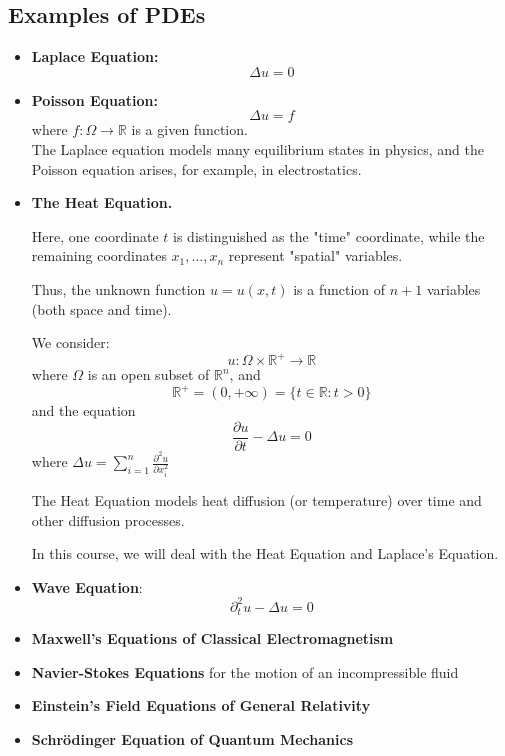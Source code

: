 
\subsection{Examples of PDEs}
\begin{itemize}
    \item \textbf{Laplace Equation:} 
\[
\Delta u = 0
\]
    \item \textbf{Poisson Equation:} 
\[
\Delta u = f
\]
where \( f: \Omega \to \mathbb{R} \) is a given function.\\
The Laplace equation models many equilibrium states in physics, and the Poisson equation arises, for example, in electrostatics.

\item \textbf{The Heat Equation.}

Here, one coordinate \( t \) is distinguished as the "time" coordinate, while the remaining coordinates \( x_1, \dots, x_n \) represent "spatial" variables. 

Thus, the unknown function \( u = u(x, t) \) is a function of $n+1$ variables (both space and time).

We consider:
\begin{equation*}
    u: \Omega \times \mathbb{R}^+ \rightarrow \mathbb{R}
\end{equation*}
where \( \Omega \) is an open subset of \( \mathbb{R}^n \), and %
\begin{equation*}
    \mathbb{R}^+ = (0,+\infty) = \{t \in \mathbb{R}: t> 0\}
\end{equation*}
and the equation 
\[
\frac{\partial u}{\partial t} - \Delta u = 0
\]
where $\Delta u= \sum_{i = 1} ^ n\frac{\partial^2 u}{\partial x_i^2}$

The Heat Equation models heat diffusion (or temperature) over time and other diffusion processes.

In this course, we will deal with the Heat Equation and Laplace's Equation.
\end{itemize}
\begin{itemize}
    \item \textbf{Wave Equation}: 
    \begin{equation*}
        \partial^2_t u - \Delta u = 0
    \end{equation*}
    \item \textbf{Maxwell's Equations of Classical Electromagnetism}
    \item \textbf{Navier-Stokes Equations} for the motion of an incompressible fluid
    \item \textbf{Einstein's Field Equations of General Relativity}
    \item \textbf{Schrödinger Equation of Quantum Mechanics}
\end{itemize}

